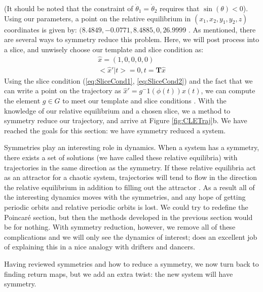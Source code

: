 \documentclass[aip,cha,reprint,
secnumarabic,
nofootinbib, tightenlines,
nobibnotes, showkeys, showpacs,
groupedaddress
]{revtex4-1}
\begin{document}
(It should be noted that the constraint of $\dot \theta_1 = \dot \theta_2$ requires that $\sin(\theta) < 0$).  Using our parameters, a point on the relative equilibrium in $(x_1, x_2, y_1, y_2, z)$ coordinates is given by: $(8.4849,-0.0771,8.4885,0,26.9999$  \cite{CB}.
As mentioned, there are several ways to symmetry reduce this problem.  Here, we will post process into a slice, and unwisely choose our template and slice condition as:
\begin{equation}
\begin{split}
\hat{x} = (1, 0, 0, 0 , 0)\\
<\hat{x}'|t> = 0, t = \mathbf{T}\hat{x}
\label{eq:CLEslice}
\end{split}
\end{equation}
Using the slice condition (\ref{eq:SliceCond1}, \ref{eq:SliceCond2}) and the fact that we can write a point on the trajectory as $\hat{x}' = g^-1(\phi(t))x(t)$, we can compute the element $g \in G$ to meet our template and slice conditions \cite{SliceCond}.
With the knowledge of our relative equilibrium and a chosen slice, we a method to symmetry reduce our trajectory, and arrive at Figure \ref{fig:CLETraj}b.  We have reached the goals for this section: we have symmetry reduced a system.

Symmetries play an interesting role in dynamics.  When a system has a symmetry, there exists a set of solutions (we have called these relative equilibria) with trajectories in the same direction as the symmetry.  If these relative equilibria act as an attractor for a chaotic system, trajectories will tend to flow in the direction the relative equilibrium in addition to filling out the attractor \cite{Atl}.  As a result all of the interesting dynamics moves with the symmetries, and any hope of getting periodic orbits and relative periodic orbits is lost.  We could try to redefine the Poincar\'e section, but then the methods developed in the previous section would be for nothing.  With symmetry reduction, however, we remove all of these complications and we will only see the dynamics of interest; \cite{Atl} does an excellent job of explaining this in a nice analogy with drifters and dancers.

Having reviewed symmetries and how to reduce a symmetry, we now turn back to finding return maps, but we add an extra twist: the new system will have symmetry.
\end{document}
